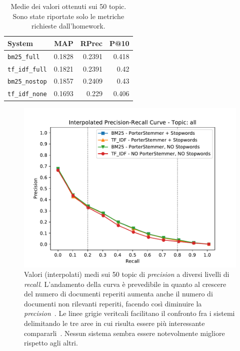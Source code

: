 \documentclass[letterpaper, 10 pt, conference]{ieeeconf}  %
\begin{document}
\begin{table}[h]
\centering
\begin{tabular}{|l|r|r|r|}
\hline
\textbf{System}      & \textbf{MAP} & \textbf{RPrec} & \textbf{P@10} \\ \hline
\texttt{bm25\_full}   & 0.1828       & 0.2391         & 0.418         \\ 
\texttt{tf\_idf\_full} & 0.1821       & 0.2391         & 0.42          \\ 
\texttt{bm25\_nostop} & 0.1857       & 0.2409         & 0.43          \\ 
\texttt{tf\_idf\_none} & 0.1693       & 0.229          & 0.406         \\ \hline
\end{tabular}
\caption{Medie dei valori ottenuti sui 50 topic. Sono state riportate solo le metriche richieste dall'homework.}
\label{tab:recap}
\end{table}

\begin{figure}[h]
    \centering
    \includegraphics[scale=0.55]{figures/iprc.pdf}
    
    \caption{Valori (interpolati) medi sui 50 topic di \textit{precision} a diversi livelli di \textit{recall}. L'andamento della curva è prevedibile in quanto al crescere del numero di documenti reperiti aumenta anche il numero di documenti non rilevanti reperiti, facendo così diminuire la \textit{precision}~\cite{measures}. Le linee grigie veritcali facilitano il confronto fra i sistemi delimitando le tre aree in cui risulta essere più interessante compararli~\cite{measures}. Nessun sistema sembra essere notevolmente migliore rispetto agli altri.}
    \label{fig:iprc}
\end{figure}
\end{document}
